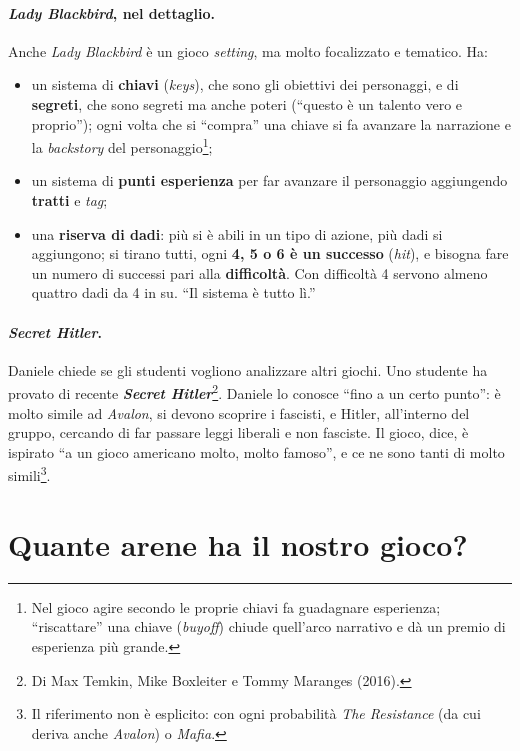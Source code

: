 \paragraph{\emph{Lady Blackbird}, nel dettaglio.} Anche \emph{Lady Blackbird} è un gioco
\emph{setting}, ma molto focalizzato e tematico. Ha:
\begin{itemize}
  \item un sistema di \textbf{chiavi} (\emph{keys}), che sono gli obiettivi dei personaggi, e di
        \textbf{segreti}, che sono segreti ma anche poteri (``questo è un talento vero e proprio'');
        ogni volta che si ``compra'' una chiave si fa avanzare la narrazione e la \emph{backstory}
        del personaggio\footnote{Nel gioco agire secondo le proprie chiavi fa guadagnare esperienza;
        ``riscattare'' una chiave (\emph{buyoff}) chiude quell'arco narrativo e dà un premio di
        esperienza più grande.};
  \item un sistema di \textbf{punti esperienza} per far avanzare il personaggio aggiungendo
        \textbf{tratti} e \emph{tag};
  \item una \textbf{riserva di dadi}: più si è abili in un tipo di azione, più dadi si aggiungono;
        si tirano tutti, ogni \textbf{4, 5 o 6 è un successo} (\emph{hit}), e bisogna fare un numero
        di successi pari alla \textbf{difficoltà}. Con difficoltà 4 servono almeno quattro dadi da 4
        in su. ``Il sistema è tutto lì.''
\end{itemize}

\paragraph{\emph{Secret Hitler}.} Daniele chiede se gli studenti vogliono analizzare altri giochi.
Uno studente ha provato di recente \textbf{\emph{Secret Hitler}}\footnote{Di Max Temkin, Mike
Boxleiter e Tommy Maranges (2016).}. Daniele lo conosce ``fino a un certo punto'': è molto simile ad
\emph{Avalon}, si devono scoprire i fascisti, e Hitler, all'interno del gruppo, cercando di far
passare leggi liberali e non fasciste. Il gioco, dice, è ispirato ``a un gioco americano molto, molto
famoso'', e ce ne sono tanti di molto simili\footnote{Il riferimento non è esplicito: con ogni
probabilità \emph{The Resistance} (da cui deriva anche \emph{Avalon}) o \emph{Mafia}.}.

\section{Quante arene ha il nostro gioco?}
\label{a16:sec:arenepw}


